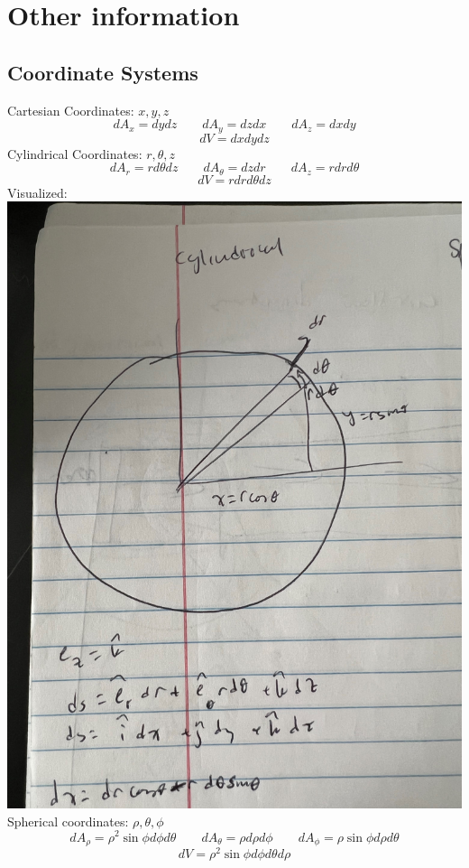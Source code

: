 \documentclass{article}
\begin{document}
    \setcounter{secnumdepth}{0}
    \section{Other information}
    \subsection{Coordinate Systems}
    \begin{outline}
        \1 Cartesian Coordinates: \(x,y,z\)\[dA_x=dydz\qquad dA_y=dzdx \qquad dA_z=dxdy\]\[dV=dxdydz\]
        \1 Cylindrical Coordinates: \(r,\theta,z\)\[dA_r=rd\theta dz\qquad dA_\theta=dzdr\qquad dA_z=rdrd\theta\]\[dV=rdrd\theta dz\]
        \1 Visualized: \\\includegraphics[scale=0.11]{cylindrical.jpg}
        \1 Spherical coordinates: \(\rho,\theta,\phi\)\[dA_\rho=\rho^2\sin\phi d\phi d\theta\qquad dA_\theta=\rho d\rho d\phi\qquad dA_\phi=\rho\sin\phi d\rho d\theta\]\[dV=\rho^2\sin\phi d\phi d\theta d\rho \]

\end{outline}
\end{document}
